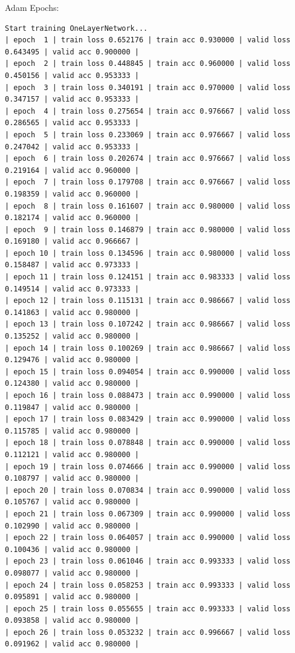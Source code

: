 \documentclass[10pt]{article}
\begin{document}
Adam Epochs:
\begin{verbatim}
Start training OneLayerNetwork...
| epoch  1 | train loss 0.652176 | train acc 0.930000 | valid loss 0.643495 | valid acc 0.900000 |
| epoch  2 | train loss 0.448845 | train acc 0.960000 | valid loss 0.450156 | valid acc 0.953333 |
| epoch  3 | train loss 0.340191 | train acc 0.970000 | valid loss 0.347157 | valid acc 0.953333 |
| epoch  4 | train loss 0.275654 | train acc 0.976667 | valid loss 0.286565 | valid acc 0.953333 |
| epoch  5 | train loss 0.233069 | train acc 0.976667 | valid loss 0.247042 | valid acc 0.953333 |
| epoch  6 | train loss 0.202674 | train acc 0.976667 | valid loss 0.219164 | valid acc 0.960000 |
| epoch  7 | train loss 0.179708 | train acc 0.976667 | valid loss 0.198359 | valid acc 0.960000 |
| epoch  8 | train loss 0.161607 | train acc 0.980000 | valid loss 0.182174 | valid acc 0.960000 |
| epoch  9 | train loss 0.146879 | train acc 0.980000 | valid loss 0.169180 | valid acc 0.966667 |
| epoch 10 | train loss 0.134596 | train acc 0.980000 | valid loss 0.158487 | valid acc 0.973333 |
| epoch 11 | train loss 0.124151 | train acc 0.983333 | valid loss 0.149514 | valid acc 0.973333 |
| epoch 12 | train loss 0.115131 | train acc 0.986667 | valid loss 0.141863 | valid acc 0.980000 |
| epoch 13 | train loss 0.107242 | train acc 0.986667 | valid loss 0.135252 | valid acc 0.980000 |
| epoch 14 | train loss 0.100269 | train acc 0.986667 | valid loss 0.129476 | valid acc 0.980000 |
| epoch 15 | train loss 0.094054 | train acc 0.990000 | valid loss 0.124380 | valid acc 0.980000 |
| epoch 16 | train loss 0.088473 | train acc 0.990000 | valid loss 0.119847 | valid acc 0.980000 |
| epoch 17 | train loss 0.083429 | train acc 0.990000 | valid loss 0.115785 | valid acc 0.980000 |
| epoch 18 | train loss 0.078848 | train acc 0.990000 | valid loss 0.112121 | valid acc 0.980000 |
| epoch 19 | train loss 0.074666 | train acc 0.990000 | valid loss 0.108797 | valid acc 0.980000 |
| epoch 20 | train loss 0.070834 | train acc 0.990000 | valid loss 0.105767 | valid acc 0.980000 |
| epoch 21 | train loss 0.067309 | train acc 0.990000 | valid loss 0.102990 | valid acc 0.980000 |
| epoch 22 | train loss 0.064057 | train acc 0.990000 | valid loss 0.100436 | valid acc 0.980000 |
| epoch 23 | train loss 0.061046 | train acc 0.993333 | valid loss 0.098077 | valid acc 0.980000 |
| epoch 24 | train loss 0.058253 | train acc 0.993333 | valid loss 0.095891 | valid acc 0.980000 |
| epoch 25 | train loss 0.055655 | train acc 0.993333 | valid loss 0.093858 | valid acc 0.980000 |
| epoch 26 | train loss 0.053232 | train acc 0.996667 | valid loss 0.091962 | valid acc 0.980000 |

\end{verbatim}
\end{document}
